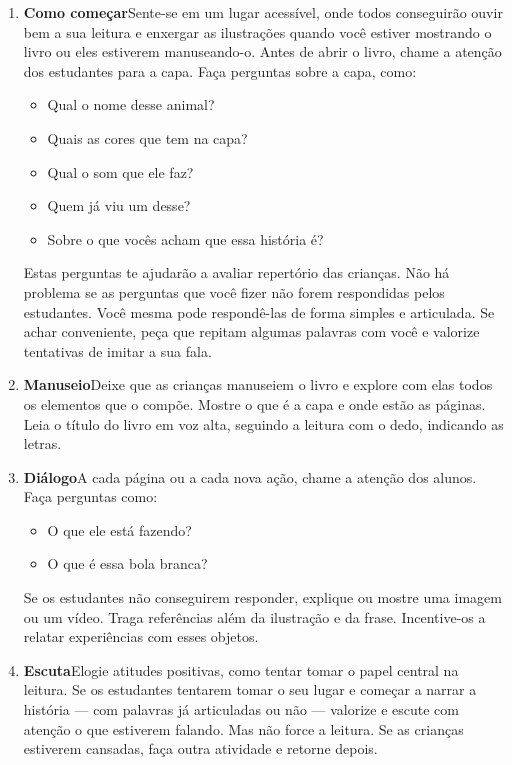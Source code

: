 \documentclass[11pt]{extarticle}
\begin{document}
\begin{enumerate}
\item \textbf{Como começar}\quad Sente-se em um lugar acessível, 
onde todos conseguirão ouvir bem a sua leitura e enxergar as ilustrações 
quando você estiver mostrando o livro ou eles estiverem manuseando-o. 
Antes de abrir o livro, chame a atenção dos estudantes para a capa. 
Faça perguntas sobre a capa, como: 

\begin{itemize}
\item Qual o nome desse animal?
\item Quais as cores que tem na capa?
\item Qual o som que ele faz?
\item Quem já viu um desse?
\item Sobre o que vocês acham que essa história é?
\end{itemize}

Estas perguntas te ajudarão a avaliar repertório das crianças. 
Não há problema se as perguntas que você fizer não forem respondidas pelos 
estudantes. Você mesma pode respondê-las de forma simples e articulada. Se achar 
conveniente, peça que repitam algumas palavras com você e valorize tentativas 
de imitar a sua fala. 
 
\item \textbf{Manuseio}\quad Deixe que as crianças manuseiem o livro 
e explore com elas todos os elementos que o compõe. Mostre o que é a 
capa e onde estão as páginas. Leia o título do livro em voz alta, seguindo 
a leitura com o dedo, indicando as letras. 

\item \textbf{Diálogo}\quad A cada página ou a cada nova ação,
chame a atenção dos alunos. Faça perguntas como:

\begin{itemize}
\item O que ele está fazendo?
\item O que é essa bola branca? 
\end{itemize}

Se os estudantes não conseguirem responder, explique ou mostre uma 
imagem ou um vídeo. Traga referências além da ilustração e da frase. 
Incentive-os a relatar experiências com esses objetos.

\item \textbf{Escuta}\quad Elogie atitudes positivas, como 
tentar tomar o papel central na leitura. Se os estudantes tentarem 
tomar o seu lugar e começar a narrar a história --- com palavras já articuladas 
ou não --- valorize e escute com atenção o que estiverem falando. Mas não 
force a leitura. Se as crianças estiverem cansadas, faça outra atividade 
e retorne depois. 


\end{enumerate}
\end{document}
